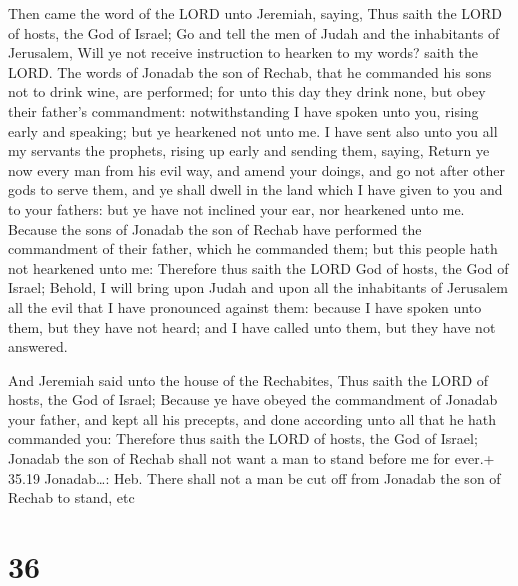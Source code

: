  Then came the word of the LORD unto Jeremiah, saying,
 Thus saith the LORD of hosts, the God of Israel; Go and
tell the men of Judah and the inhabitants of Jerusalem, Will ye not
receive instruction to hearken to my words? saith the LORD.
 The words of Jonadab the son of Rechab, that he commanded
his sons not to drink wine, are performed; for unto this day they drink
none, but obey their father's commandment: notwithstanding I have spoken
unto you, rising early and speaking; but ye hearkened not unto me.
 I have sent also unto you all my servants the prophets,
rising up early and sending them, saying, Return ye now every man from
his evil way, and amend your doings, and go not after other gods to
serve them, and ye shall dwell in the land which I have given to you and
to your fathers: but ye have not inclined your ear, nor hearkened unto
me.  Because the sons of Jonadab the son of Rechab have
performed the commandment of their father, which he commanded them; but
this people hath not hearkened unto me:  Therefore thus
saith the LORD God of hosts, the God of Israel; Behold, I will bring
upon Judah and upon all the inhabitants of Jerusalem all the evil that I
have pronounced against them: because I have spoken unto them, but they
have not heard; and I have called unto them, but they have not answered.

 And Jeremiah said unto the house of the Rechabites, Thus
saith the LORD of hosts, the God of Israel; Because ye have obeyed the
commandment of Jonadab your father, and kept all his precepts, and done
according unto all that he hath commanded you:  Therefore
thus saith the LORD of hosts, the God of Israel; Jonadab the son of
Rechab shall not want a man to stand before me for ever.+ 35.19
Jonadab\ldots: Heb. There shall not a man be cut off from Jonadab the
son of Rechab to stand, etc

\hypertarget{section-35}{%
\section{36}\label{section-35}}


